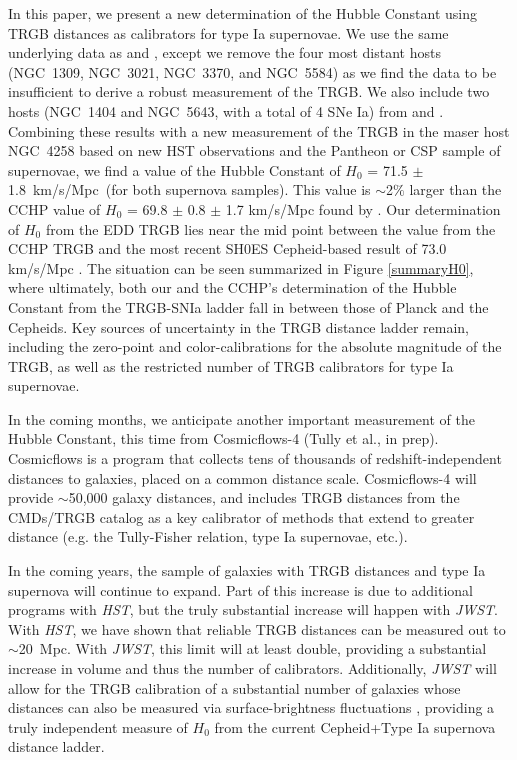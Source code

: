 \documentclass[twocolumn]{aastex62}
\newcommand{\hubblePan}{71.5 $\pm$ 1.8~km/s/Mpc}
\begin{document}
In this paper, we present a new determination of the Hubble Constant using TRGB distances as calibrators for type Ia supernovae. We use the same underlying data as \cite{2019ApJ...882...34F} and \cite{2021arXiv210615656F}, except we remove the four most distant hosts (NGC~1309, NGC~3021, NGC~3370, and NGC~5584) as we find the data to be insufficient to derive a robust measurement of the TRGB. We also include two hosts (NGC~1404 and NGC~5643, with a total of 4 SNe Ia) from \cite{2021arXiv210112232H} and \cite{2021arXiv210615656F}. Combining these results with a new measurement of the TRGB in the maser host NGC~4258 based on new HST observations and the Pantheon or CSP sample of supernovae, we find a value of the Hubble Constant of $H_{0}$ = \hubblePan\ (for both supernova samples). This value is $\sim$2$\%$ larger than the CCHP value of $H_{0}$ = 69.8 $\pm$ 0.8 $\pm$ 1.7 km/s/Mpc found by \cite{2019ApJ...882...34F}. Our determination of $H_0$ from the EDD TRGB lies near the mid point between the value from the CCHP TRGB and the most recent SH0ES Cepheid-based result of 73.0 km/s/Mpc \citep{2021arXiv211204510R}. The situation can be seen summarized in Figure \ref{summaryH0}, where ultimately, both our and the CCHP's determination of the Hubble Constant from the TRGB-SNIa ladder fall in between those of Planck and the Cepheids. Key sources of uncertainty in the TRGB distance ladder remain, including the zero-point and color-calibrations for the absolute magnitude of the TRGB, as well as the restricted number of TRGB calibrators for type Ia supernovae.

In the coming months, we anticipate another important measurement of the Hubble Constant, this time from Cosmicflows-4 (Tully et al., in prep). Cosmicflows is a program that collects tens of thousands of redshift-independent distances to galaxies, placed on a common distance scale. Cosmicflows-4 will provide $\sim$50,000 galaxy distances, and includes TRGB distances from the CMDs/TRGB catalog as a key calibrator of methods that extend to greater distance (e.g. the Tully-Fisher relation, type Ia supernovae, etc.). 

In the coming years, the sample of galaxies with TRGB distances and type Ia supernova will continue to expand. Part of this increase is due to additional programs with \textit{HST}, but the truly substantial increase will happen with \textit{JWST}. With \textit{HST}, we have shown that reliable TRGB distances can be measured out to $\sim$20~Mpc. With \textit{JWST}, this limit will at least double, providing a substantial increase in volume and thus the number of calibrators. Additionally, \textit{JWST} will allow for the TRGB calibration of a substantial number of galaxies whose distances can also be measured via surface-brightness fluctuations \citep{2021ApJ...911...65B}, providing a truly independent measure of $H_{0}$ from the current Cepheid+Type Ia supernova distance ladder.
\end{document}
